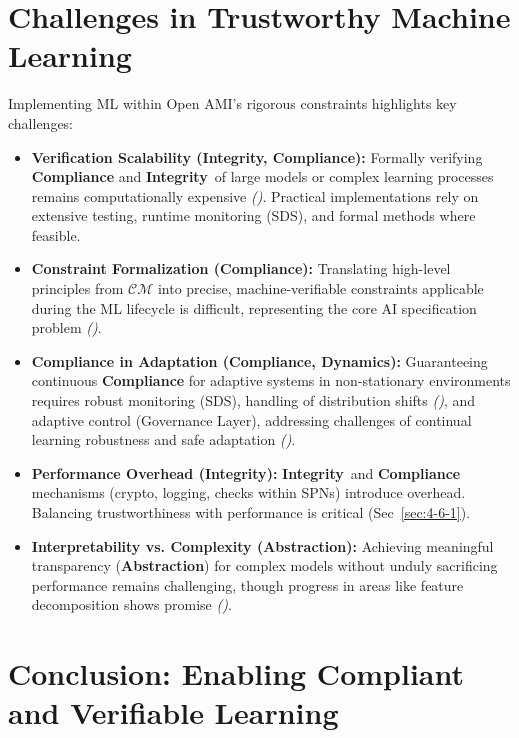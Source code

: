 \documentclass[12pt,a4paper]{report}
\renewcommand{\citep}[1]{\textit{\scriptsize{(\cite{#1})}}}
\newcommand{\Compliance}{\textbf{Compliance}}
\newcommand{\Integrity}{\textbf{Integrity}}
\newcommand{\Abstraction}{\textbf{Abstraction}}
\begin{document}
	\section{Challenges in Trustworthy Machine Learning} %
	\label{sec:3-9} %
	
	Implementing ML within Open AMI's rigorous constraints highlights key challenges:
	
	\begin{itemize}
		\item \textbf{Verification Scalability (\Integrity, Compliance):} Formally verifying \textbf{Compliance} and \Integrity\ of large models or complex learning processes remains computationally expensive \citep{Peng2025ZKMLSurvey}. Practical implementations rely on extensive testing, runtime monitoring (SDS), and formal methods where feasible.
		\item \textbf{Constraint Formalization (\Compliance):} Translating high-level principles from $\mathcal{CM}$ into precise, machine-verifiable constraints applicable during the ML lifecycle is difficult, representing the core AI specification problem \citep{Kovac2025SpecGaming}.
		\item \textbf{Compliance in Adaptation (\Compliance, Dynamics):} Guaranteeing continuous \textbf{Compliance} for adaptive systems in non-stationary environments requires robust monitoring (SDS), handling of distribution shifts \citep{AdditionalCitationRef53}, and adaptive control (Governance Layer), addressing challenges of continual learning robustness and safe adaptation \citep{Josifovski_SCDA_2025}.
		\item \textbf{Performance Overhead (\Integrity):} \Integrity\ and \textbf{Compliance} mechanisms (crypto, logging, checks within SPNs) introduce overhead. Balancing trustworthiness with performance is critical (Sec~\ref{sec:4-6-1}).
		\item \textbf{Interpretability vs. Complexity (\Abstraction):} Achieving meaningful transparency (\Abstraction) for complex models without unduly sacrificing performance remains challenging, though progress in areas like feature decomposition shows promise \citep{Anthropic_Decompose_2023}.
	\end{itemize}
	
	\section{Conclusion: Enabling Compliant and Verifiable Learning} %
	\label{sec:3-10} %
	
\end{document}
